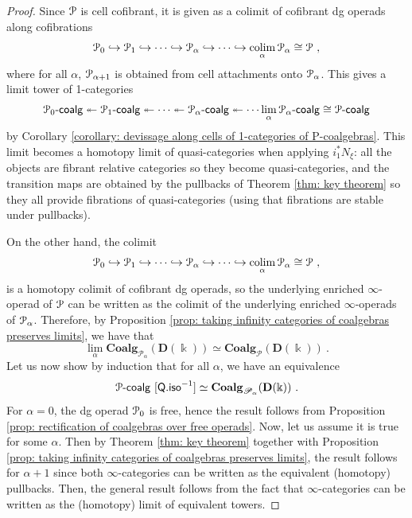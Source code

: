\documentclass[a4paper,12pt]{amsart}
\renewcommand{\mathcal}{\EuScript}
\DeclareMathOperator*{\colim}{colim}
\newcommand{\oneop}{\mathcal{P}}
\newcommand{\onecoalg}[1]{#1\text{-}\mathsf{coalg}}
\theoremstyle{plain}
\theoremstyle{definition}
\theoremstyle{remark}
\newcommand{\kk}{\Bbbk}
\begin{document}
\begin{proof}
Since $\mathcal{P}$ is cell cofibrant, it is given as a colimit of cofibrant dg operads along cofibrations
\[
\oneop_0 \hookrightarrow \oneop_1 \hookrightarrow \cdots \hookrightarrow \oneop_\alpha \hookrightarrow \cdots \hookrightarrow \colim_{\alpha} \oneop_\alpha \cong \oneop~, 
\]
where for all $\alpha$, $\oneop_{\alpha +1}$ is obtained from cell attachments onto $\oneop_\alpha$. This gives a limit tower of 1-categories
\[
\onecoalg{\oneop_0}  \twoheadleftarrow \onecoalg{\oneop_1} \twoheadleftarrow \cdots \twoheadleftarrow \onecoalg{\oneop_\alpha}  \twoheadleftarrow  \cdots \lim_{\alpha}\onecoalg{\oneop_\alpha} \cong \onecoalg{\oneop}
\]
by Corollary \ref{corollary: devissage along cells of 1-categories of P-coalgebras}. This limit becomes a homotopy limit of quasi-categories when applying $i_1^*N_{\xi}$: all the objects are fibrant relative categories so they become quasi-categories, and the transition maps are obtained by the pullbacks of Theorem \ref{thm: key theorem} so they all provide fibrations of quasi-categories (using that fibrations are stable under pullbacks).

On the other hand, the colimit 
\[
\oneop_0 \hookrightarrow \oneop_1 \hookrightarrow \cdots \hookrightarrow \oneop_\alpha \hookrightarrow \cdots \hookrightarrow \colim_{\alpha} \oneop_\alpha \cong \oneop~, 
\]
is a homotopy colimit of cofibrant dg operads, so the underlying enriched $\infty$-operad of $\mathcal{P}$ can be written as the colimit of the underlying enriched $\infty$-operads of $\oneop_\alpha$. Therefore, by Proposition \ref{prop: taking infinity categories of coalgebras preserves limits}, we have that 
\[
\lim_{\alpha} \mathbf{Coalg}_{\mathscr{P}_\alpha}(\mathbf{D}(\kk)) \simeq \mathbf{Coalg}_{\mathscr{P}}(\mathbf{D}(\kk))~.
\]
Let us now show by induction that for all $\alpha$, we have an equivalence 
\[
\mathcal{P}\text{-}\mathsf{coalg}~[\mathsf{Q.iso}^{-1}] \simeq \mathbf{Coalg}_{\mathscr{P}_\alpha}(\mathbf{D}(\kk))~.
\]
For $\alpha = 0$, the dg operad $\mathcal{P}_0$ is free, hence the result follows from Proposition \ref{prop: rectification of coalgebras over free operads}. Now, let us assume it is true for some $\alpha$. Then by Theorem \ref{thm: key theorem} together with Proposition \ref{prop: taking infinity categories of coalgebras preserves limits}, the result follows for $\alpha +1$ since both $\infty$-categories can be written as the equivalent (homotopy) pullbacks. Then, the general result follows from the fact that $\infty$-categories can be written as the (homotopy) limit of equivalent towers.
\end{proof}
\end{document}
